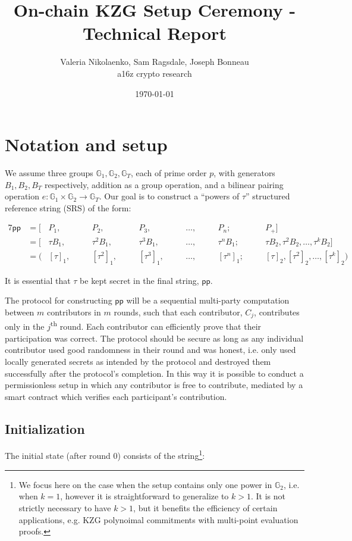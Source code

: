 \documentclass{article}
\title{On-chain KZG Setup Ceremony - Technical Report}
\author{Valeria Nikolaenko, Sam Ragsdale, Joseph Bonneau\\a16z crypto research}
\date{\today}
\newcommand{\pp}{\mathsf{pp}}
\newcommand{\GG}{\mathbb{G}}
\begin{document}
\maketitle

\section{Notation and setup}

We assume three groups $\mathbb{G}_1, \mathbb{G}_2, \mathbb{G}_T$, each of prime order $p$, with generators $B_1, B_2, B_T$ respectively, addition as a group operation, and a bilinear pairing operation $e: \mathbb{G}_1 \times \mathbb{G}_2 \rightarrow \mathbb{G}_T$. Our goal is to construct a ``powers of $\tau$'' structured reference string (SRS) of the form:

\begin{alignat}{7}
\pp &=[ &P_1,& \quad &P_2,&  \quad &P_3,&  \quad &\ldots,&  \quad &P_n;&  \quad &P_+]&
\\
&=[ &\tau B_1,& &\tau^2 B_1,& &\tau^3 B_1,& &\ldots,& &\tau^n B_1;& & \tau B_2, \tau^2 B_2, \ldots, \tau^k B_2]&\\
&=( &[\tau]_1,& &[\tau^2]_1,& &[\tau^3]_1,& &\ldots,& &[\tau^n]_1;& & [\tau]_2, [\tau^2]_2, \ldots, [\tau^k]_2)&
\end{alignat}

It is essential that $\tau$ be kept secret in the final string, $\pp$.

The protocol for constructing $\pp$ will be a sequential multi-party computation between $m$ contributors in $m$ rounds, such that each contributor, $C_j$, contributes only in the $j$\textsuperscript{th} round.
Each contributor can efficiently prove that their participation was correct. The protocol should be secure as long as any individual contributor used good randomness in their round and was honest, i.e. only used locally generated secrets as intended by the protocol and destroyed them successfully after the protocol's completion.
In this way it is possible to conduct a permissionless setup in which any contributor is free to contribute, mediated by a smart contract which verifies each participant's contribution.

\subsection{Initialization}
The initial state (after round 0) consists of the string\footnote{We focus here on the case when the setup contains only one power in $\GG_2$, i.e. when $k = 1$, however it is straightforward to generalize to $k > 1$. It is not strictly necessary to have $k > 1$, but it benefits the efficiency of certain applications, e.g. KZG polynoimal commitments with multi-point evaluation proofs.}:
\end{document}
